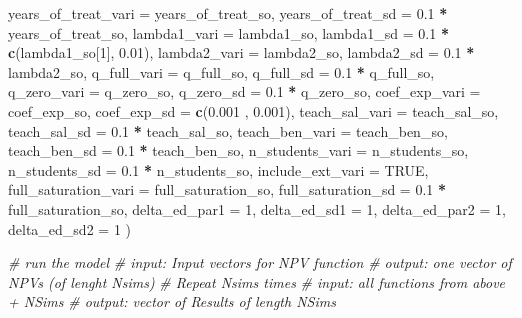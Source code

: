 \documentclass[]{article}
\newenvironment{Shaded}{\begin{snugshade}}{\end{snugshade}}
\newcommand{\CommentTok}[1]{\textcolor[rgb]{0.56,0.35,0.01}{\textit{#1}}}
\newcommand{\DataTypeTok}[1]{\textcolor[rgb]{0.13,0.29,0.53}{#1}}
\newcommand{\DecValTok}[1]{\textcolor[rgb]{0.00,0.00,0.81}{#1}}
\newcommand{\FloatTok}[1]{\textcolor[rgb]{0.00,0.00,0.81}{#1}}
\newcommand{\KeywordTok}[1]{\textcolor[rgb]{0.13,0.29,0.53}{\textbf{#1}}}
\newcommand{\NormalTok}[1]{#1}
\newcommand{\OperatorTok}[1]{\textcolor[rgb]{0.81,0.36,0.00}{\textbf{#1}}}
\newcommand{\OtherTok}[1]{\textcolor[rgb]{0.56,0.35,0.01}{#1}}
\newcommand{\StringTok}[1]{\textcolor[rgb]{0.31,0.60,0.02}{#1}}
\begin{document}
\begin{Shaded}
\begin{Highlighting}[]
          \DataTypeTok{years_of_treat_vari =}\NormalTok{ years_of_treat_so,}
          \DataTypeTok{years_of_treat_sd =} \FloatTok{0.1} \OperatorTok{*}\StringTok{ }\NormalTok{years_of_treat_so,}
          \DataTypeTok{lambda1_vari =}\NormalTok{ lambda1_so,}
          \DataTypeTok{lambda1_sd =} \FloatTok{0.1} \OperatorTok{*}\StringTok{ }\KeywordTok{c}\NormalTok{(lambda1_so[}\DecValTok{1}\NormalTok{], }\FloatTok{0.01}\NormalTok{),}
          \DataTypeTok{lambda2_vari =}\NormalTok{ lambda2_so, }
          \DataTypeTok{lambda2_sd =} \FloatTok{0.1} \OperatorTok{*}\StringTok{ }\NormalTok{lambda2_so, }
          \DataTypeTok{q_full_vari =}\NormalTok{ q_full_so, }
          \DataTypeTok{q_full_sd =} \FloatTok{0.1} \OperatorTok{*}\StringTok{ }\NormalTok{q_full_so, }
          \DataTypeTok{q_zero_vari =}\NormalTok{ q_zero_so, }
          \DataTypeTok{q_zero_sd =} \FloatTok{0.1} \OperatorTok{*}\StringTok{ }\NormalTok{q_zero_so, }
          \DataTypeTok{coef_exp_vari =}\NormalTok{ coef_exp_so, }
          \DataTypeTok{coef_exp_sd =} \KeywordTok{c}\NormalTok{(}\FloatTok{0.001}\NormalTok{ , }\FloatTok{0.001}\NormalTok{), }
          \DataTypeTok{teach_sal_vari =}\NormalTok{ teach_sal_so,}
          \DataTypeTok{teach_sal_sd =} \FloatTok{0.1} \OperatorTok{*}\StringTok{ }\NormalTok{teach_sal_so,}
          \DataTypeTok{teach_ben_vari =}\NormalTok{ teach_ben_so,}
          \DataTypeTok{teach_ben_sd =} \FloatTok{0.1} \OperatorTok{*}\StringTok{ }\NormalTok{teach_ben_so,}
          \DataTypeTok{n_students_vari =}\NormalTok{ n_students_so, }
          \DataTypeTok{n_students_sd =} \FloatTok{0.1} \OperatorTok{*}\StringTok{ }\NormalTok{n_students_so, }
          \DataTypeTok{include_ext_vari =} \OtherTok{TRUE}\NormalTok{, }
          \DataTypeTok{full_saturation_vari =}\NormalTok{ full_saturation_so,}
          \DataTypeTok{full_saturation_sd =} \FloatTok{0.1} \OperatorTok{*}\StringTok{ }\NormalTok{full_saturation_so,}
          \DataTypeTok{delta_ed_par1 =} \DecValTok{1}\NormalTok{,}
          \DataTypeTok{delta_ed_sd1 =} \DecValTok{1}\NormalTok{,}
          \DataTypeTok{delta_ed_par2 =} \DecValTok{1}\NormalTok{,}
          \DataTypeTok{delta_ed_sd2 =} \DecValTok{1}
\NormalTok{) }
 
 




\CommentTok{# run the model }
\CommentTok{#  input: Input vectors for NPV function}
\CommentTok{#  output: one vector of NPVs (of lenght Nsims)}
\CommentTok{# Repeat Nsims times}
\CommentTok{#  input: all functions from above + NSims}
\CommentTok{#  output: vector of Results of length NSims}


\end{Highlighting}
\end{Shaded}
\end{document}
